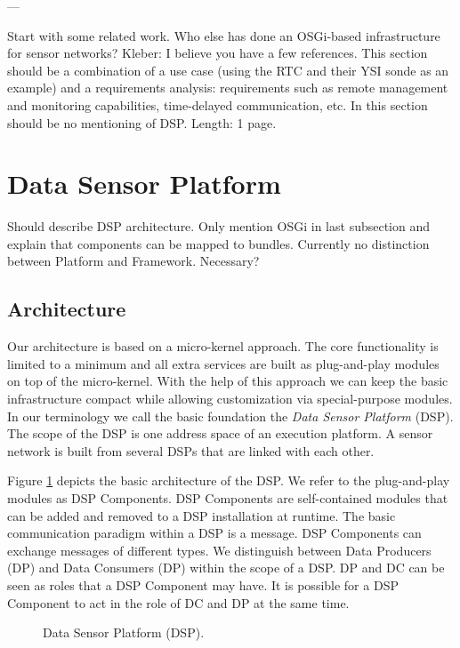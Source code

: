 \documentclass[conference]{IEEEtran}
\begin{document}
---

Start with some related work. Who else has done an OSGi-based
infrastructure for sensor networks? Kleber: I believe you have a few
references. This section should be a combination of a use case (using
the RTC and their YSI sonde as an example) and a requirements
analysis: requirements such as remote management and monitoring
capabilities, time-delayed communication, etc. In this section should
be no mentioning of DSP. Length: 1 page.

\section{Data Sensor Platform}

Should describe DSP architecture. Only mention OSGi in last subsection
and explain that components can be mapped to bundles. Currently no
distinction between Platform and Framework. Necessary?


\subsection{Architecture}

Our architecture is based on a micro-kernel approach. The core
functionality is limited to a minimum and all extra services are built
as plug-and-play modules on top of the micro-kernel. With the help of
this approach we can keep the basic infrastructure compact while
allowing customization via special-purpose modules. In our terminology
we call the basic foundation the \emph{Data Sensor Platform}
(DSP). The scope of the DSP is one address space of an execution
platform. A sensor network is built from several DSPs that are linked
with each other.

Figure \ref{FIG_DSP} depicts the basic architecture of the
DSP. We refer to the plug-and-play modules as DSP Components. DSP
Components are self-contained modules that can be added and removed to
a DSP installation at runtime. The basic communication paradigm within
a DSP is a message. DSP Components can exchange messages of different
types. We distinguish between Data Producers (DP) and Data Consumers
(DP) within the scope of a DSP. DP and DC can be seen as roles that a
DSP Component may have. It is possible for a DSP Component to act in
the role of DC and DP at the same time.


\begin{figure}
\centering
{}
\caption{\label{FIG_DSP} Data Sensor Platform (DSP).}
\end{figure}
\end{document}
